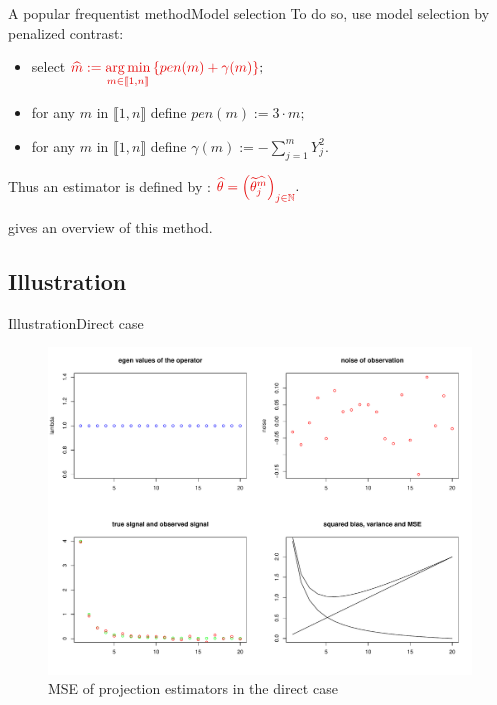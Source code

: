 \documentclass[10pt]{beamer}
\DeclareMathOperator*{\argmin}{arg\,min}
\begin{document}
\begin{frame}{A popular frequentist method}{Model selection}
To do so, use model selection by penalized contrast:

\medskip

\begin{itemize}
\setlength\itemsep{1em}
\item<1-> select $\textcolor{red!90!black}{\widehat{m} := \argmin\limits_{m \in \llbracket 1, n\rrbracket}\left\{pen(m) + \gamma(m)\right\}};$
\item<2-> for any $m$ in $\llbracket 1, n\rrbracket$ define $pen(m) := 3 \cdot m;$
\item<3-> for any $m$ in $\llbracket 1, n\rrbracket$ define $\gamma(m) := -\sum\limits_{j = 1}^{m} Y_{j}^{2}.$
\end{itemize}

\medskip

Thus an estimator is defined by : $\textcolor{red!90!black}{\widehat{\theta} = \left(\widetilde{\theta}^{\widehat{m}}_{j}\right)_{j \in \mathbb{N}}}.$

\medskip

\textbf{\citet{PM}} gives an overview of this method.
\end{frame}

\subsection{Illustration}
\begin{frame}{Illustration}{Direct case}
\begin{figure}
\centering
 \includegraphics[width=.8\linewidth]{direct-case.pdf}
\caption{MSE of projection estimators in the direct case}\label{DC}
\end{figure}
\end{frame}
\end{document}
